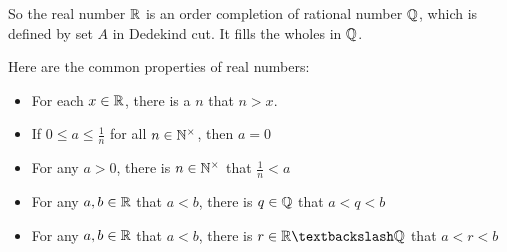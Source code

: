 So the real number $\mathbb{R}$ is an order completion of rational number $\mathbb{Q}$, which is defined by set $A$ in Dedekind cut. It fills the wholes in $\mathbb{Q}$.

\begin{theorem}
    Here are the common properties of real numbers:
    \begin{itemize}
        \item For each $x \in \mathbb{R}$, there is a $n$ that $n > x$.
        \item If $\displaystyle 0 \leq a \leq \frac{1}{n}$ for all $n \in \mathbb{N}^{\times}$, then $a = 0$
        \item For any $a >0$, there is $n \in \mathbb{N}^{\times}$ that $\displaystyle \frac{1}{n} < a$
        \item For any $a,b\in \mathbb{R}$ that $a < b$, there is $q \in \mathbb{Q}$ that $a < q < b$
        \item For any $a,b\in \mathbb{R}$ that $a < b$, there is $r \in \realnumber \textbackslash \rational $ that $a < r < b$
    \end{itemize}    
\end{theorem}

